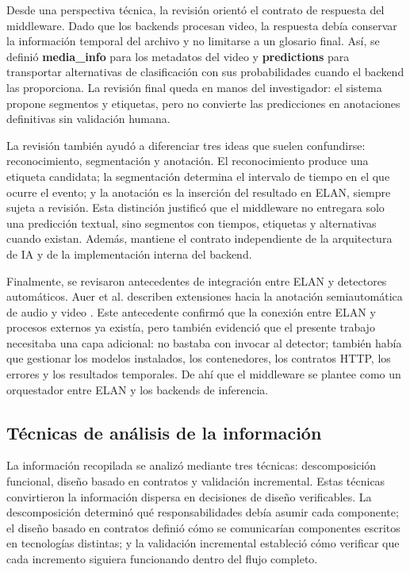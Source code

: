 Desde una perspectiva técnica, la revisión orientó el contrato de respuesta del middleware. Dado que los backends procesan video, la respuesta debía conservar la información temporal del archivo y no limitarse a un glosario final. Así, se definió \textbf{media\_info} para los metadatos del video y \textbf{predictions} para transportar alternativas de clasificación con sus probabilidades cuando el backend las proporciona. La revisión final queda en manos del investigador: el sistema propone segmentos y etiquetas, pero no convierte las predicciones en anotaciones definitivas sin validación humana.

La revisión también ayudó a diferenciar tres ideas que suelen confundirse: reconocimiento, segmentación y anotación. El reconocimiento produce una etiqueta candidata; la segmentación determina el intervalo de tiempo en el que ocurre el evento; y la anotación es la inserción del resultado en ELAN, siempre sujeta a revisión. Esta distinción justificó que el middleware no entregara solo una predicción textual, sino segmentos con tiempos, etiquetas y alternativas cuando existan. Además, mantiene el contrato independiente de la arquitectura de IA y de la implementación interna del backend.

Finalmente, se revisaron antecedentes de integración entre ELAN y detectores automáticos. Auer et al. describen extensiones hacia la anotación semiautomática de audio y video \cite{auer2010elan}. Este antecedente confirmó que la conexión entre ELAN y procesos externos ya existía, pero también evidenció que el presente trabajo necesitaba una capa adicional: no bastaba con invocar al detector; también había que gestionar los modelos instalados, los contenedores, los contratos HTTP, los errores y los resultados temporales. De ahí que el middleware se plantee como un orquestador entre ELAN y los backends de inferencia.

\subsection{Técnicas de análisis de la información}

La información recopilada se analizó mediante tres técnicas: descomposición funcional, diseño basado en contratos y validación incremental. Estas técnicas convirtieron la información dispersa en decisiones de diseño verificables. La descomposición determinó qué responsabilidades debía asumir cada componente; el diseño basado en contratos definió cómo se comunicarían componentes escritos en tecnologías distintas; y la validación incremental estableció cómo verificar que cada incremento siguiera funcionando dentro del flujo completo.

